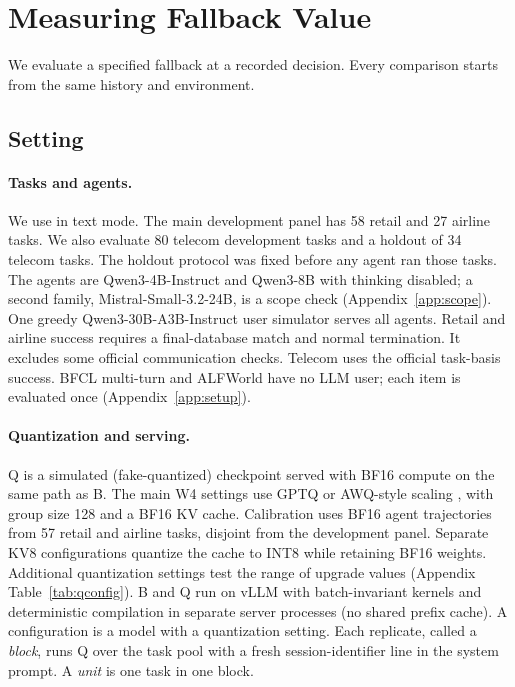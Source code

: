 \section{Measuring Fallback Value}
\label{sec:method}

We evaluate a specified fallback at a recorded decision. Every comparison starts from the same history and environment.

\subsection{Setting}
\label{sec:setting}

\paragraph{Tasks and agents.} We use \tautwo{} in text mode. The main development panel has 58 retail and 27 airline tasks. We also evaluate 80 telecom development tasks and a holdout of 34 telecom tasks. The holdout protocol was fixed before any agent ran those tasks. %
The agents are Qwen3-4B-Instruct and Qwen3-8B with thinking disabled; a second family, Mistral-Small-3.2-24B, is a scope check (Appendix~\ref{app:scope}). %
One greedy Qwen3-30B-A3B-Instruct user simulator serves all agents. %
Retail and airline success requires a final-database match and normal termination. It excludes some official communication checks. Telecom uses the official task-basis success. BFCL multi-turn and ALFWorld have no LLM user; each item is evaluated once (Appendix~\ref{app:setup}).

\paragraph{Quantization and serving.} Q is a simulated (fake-quantized) checkpoint served with BF16 compute on the same path as B. The main W4 settings use GPTQ \citep{frantar2023gptq} or AWQ-style scaling \citep{lin2024awq}, with group size 128 and a BF16 KV cache. Calibration uses BF16 agent trajectories from 57 retail and airline tasks, disjoint from the development panel. Separate KV8 configurations quantize the cache to INT8 while retaining BF16 weights. Additional quantization settings test the range of upgrade values (Appendix Table~\ref{tab:qconfig}). %
B and Q run on vLLM \citep{kwon2023vllm} with batch-invariant kernels \citep{he2025defeating} and deterministic compilation in separate server processes (no shared prefix cache). A configuration is a model with a quantization setting. Each replicate, called a \emph{block}, runs Q over the task pool with a fresh session-identifier line in the system prompt. A \emph{unit} is one task in one block.

